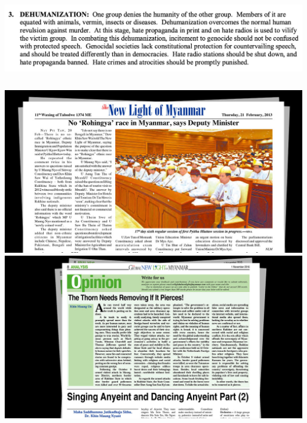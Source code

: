 \documentclass[nobackground,dvipsnames,table]{beamer}
\begin{document}
\begin{frame}{}
    \includegraphics[width=\textwidth]{dehumanization}
    \begin{columns}
            \includegraphics[width=\textwidth]{rohingya-myanmar}
            \includegraphics[width=\textwidth]{rohingya-as-a-thorn}
    \end{columns}
\end{frame}
\end{document}
